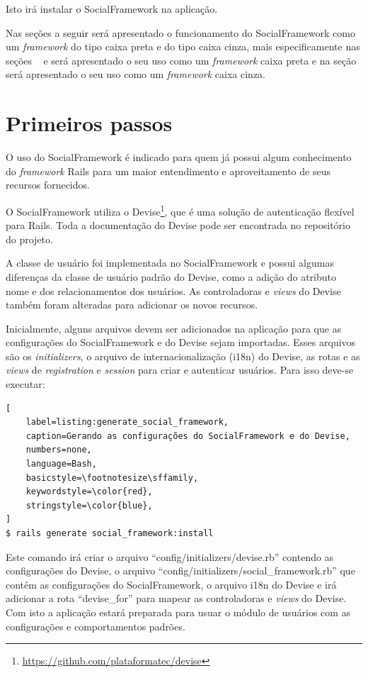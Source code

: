 Isto irá instalar o SocialFramework na aplicação.

Nas seções a seguir será apresentado o funcionamento do SocialFramework como um \textit{framework} do tipo caixa preta e do tipo caixa cinza, mais especificamente nas seções ~ e  será apresentado o seu uso como um \textit{framework} caixa preta e na seção  será apresentado o seu uso como um \textit{framework} caixa cinza.

\section{Primeiros passos}
\label{sec:primeiros_passos}

O uso do SocialFramework é indicado para quem já possui algum conhecimento do \textit{framework} Rails para um maior entendimento e aproveitamento de seus recursos fornecidos.

O SocialFramework utiliza o Devise\footnote{\url{https://github.com/plataformatec/devise}}, que é uma solução de autenticação flexível para Rails. Toda a documentação do Devise pode ser encontrada no repositório do projeto.

A classe de usuário foi implementada no SocialFramework e possui algumas diferenças da classe de usuário padrão do Devise, como a adição do atributo nome e dos relacionamentos dos usuários. As controladoras e \textit{views} do Devise também foram alteradas para adicionar os novos recursos.

Inicialmente, alguns arquivos devem ser adicionados na aplicação para que as configurações do SocialFramework e do Devise sejam importadas. Esses arquivos são os \textit{initializers}, o arquivo de internacionalização (i18n) do Devise, as rotas e as \textit{views} de \textit{registration} e \textit{session} para criar e autenticar usuários. Para isso deve-se executar:

\begin{lstlisting}[
    label=listing:generate_social_framework,
    caption=Gerando as configurações do SocialFramework e do Devise,
    numbers=none,
    language=Bash,
    basicstyle=\footnotesize\sffamily,
    keywordstyle=\color{red},
    stringstyle=\color{blue},
]
$ rails generate social_framework:install
\end{lstlisting}

Este comando irá criar o arquivo ``config/initializers/devise.rb'' contendo as configurações do Devise, o arquivo ``config/initializers/social\_framework.rb'' que contém as configurações do SocialFramework, o arquivo i18n do Devise e irá adicionar a rota ``devise\_for'' para mapear as controladoras e \textit{views} do Devise. Com isto a aplicação estará preparada para usuar o módulo de usuários com as configurações e comportamentos padrões.

